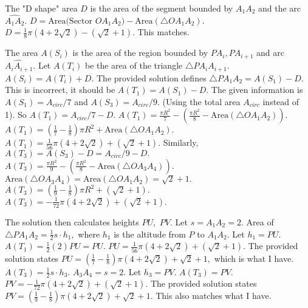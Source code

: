 The "D shape" area $D$ is the area of the segment bounded by $A_1A_2$ and the arc $\widehat{A_1A_2}.$ 
$D = \text{Area(Sector } OA_1A_2) - \text{Area}(\triangle OA_1A_2).$ 
$D = \frac{1}{8} \pi (4+2\sqrt{2}) - (\sqrt{2}+1).$ This matches.

The area $A(S_i)$ is the area of the region bounded by $PA_i, PA_{i+1}$ and arc $\widehat{A_iA_{i+1}}.$ 
Let $A(T_i)$ be the area of the triangle $\triangle PA_iA_{i+1}.$ 
$A(S_i) = A(T_i) + D.$ 
The provided solution defines $\triangle PA_1A_2 = A(S_1) - D.$ This is incorrect, it should be $A(T_1) = A(S_1) - D.$ 
The given information is $A(S_1) = A_{circ}/7$ and $A(S_3) = A_{circ}/9.$ (Using the total area $A_{circ}$ instead of 1). 
So $A(T_1) = A_{circ}/7 - D.$ 
$A(T_1) = \frac{\pi R^2}{7} - (\frac{\pi R^2}{8} - \text{Area}(\triangle OA_1A_2)).$ 
$A(T_1) = (\frac{1}{7} - \frac{1}{8}) \pi R^2 + \text{Area}(\triangle OA_1A_2).$ 
$A(T_1) = \frac{1}{56} \pi (4+2\sqrt{2}) + (\sqrt{2}+1).$ 
Similarly, $A(T_3) = A(S_3) - D = A_{circ}/9 - D.$ 
$A(T_3) = \frac{\pi R^2}{9} - (\frac{\pi R^2}{8} - \text{Area}(\triangle OA_3A_4)).$ 
$\text{Area}(\triangle OA_3A_4) = \text{Area}(\triangle OA_1A_2) = \sqrt{2}+1.$ 
$A(T_3) = (\frac{1}{9} - \frac{1}{8}) \pi R^2 + (\sqrt{2}+1).$ 
$A(T_3) = -\frac{1}{72} \pi (4+2\sqrt{2}) + (\sqrt{2}+1).$

The solution then calculates heights $PU,$ $PV.$ Let $s=A_1A_2=2.$ Area of $\triangle PA_1A_2 = \frac{1}{2} s \cdot h_1,$ where $h_1$ is the altitude from $P$ to $A_1A_2.$ Let $h_1=PU.$ 
$A(T_1) = \frac{1}{2} (2) PU = PU.$ 
$PU = \frac{1}{56} \pi (4+2\sqrt{2}) + (\sqrt{2}+1).$ 
The provided solution states $PU = (\frac{1}{7}-\frac{1}{8}) \pi (4+2\sqrt{2}) + \sqrt{2}+1,$ which is what I have. 
$A(T_3) = \frac{1}{2} s \cdot h_3.$ $A_3A_4=s=2.$ Let $h_3=PV.$ 
$A(T_3) = PV.$ 
$PV = -\frac{1}{72} \pi (4+2\sqrt{2}) + (\sqrt{2}+1).$ 
The provided solution states $PV = (\frac{1}{9}-\frac{1}{8}) \pi (4+2\sqrt{2}) + \sqrt{2}+1.$ This also matches what I have.

